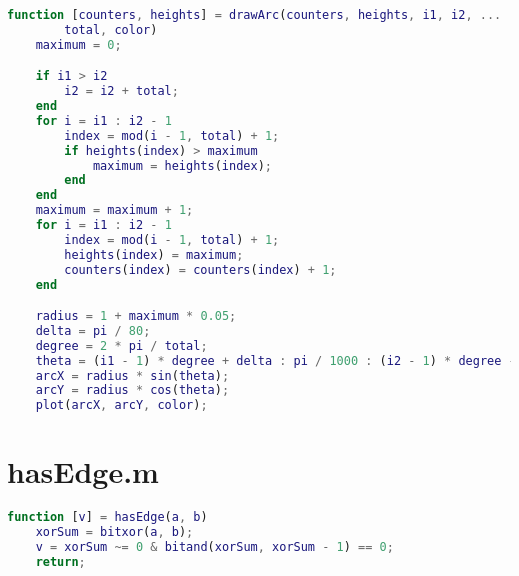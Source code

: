 \begin{lstlisting}[language = Matlab]
%% drawArc: draw an arc
function [counters, heights] = drawArc(counters, heights, i1, i2, ...
		total, color)
	maximum = 0;

	if i1 > i2
		i2 = i2 + total;
	end
	for i = i1 : i2 - 1
		index = mod(i - 1, total) + 1;
		if heights(index) > maximum
			maximum = heights(index);
		end
	end
	maximum = maximum + 1;
	for i = i1 : i2 - 1
		index = mod(i - 1, total) + 1;
		heights(index) = maximum;
		counters(index) = counters(index) + 1;
	end

	radius = 1 + maximum * 0.05;
	delta = pi / 80;
	degree = 2 * pi / total;
	theta = (i1 - 1) * degree + delta : pi / 1000 : (i2 - 1) * degree - delta;
	arcX = radius * sin(theta);
	arcY = radius * cos(theta);
	plot(arcX, arcY, color);
\end{lstlisting}

\clearpage
\section{hasEdge.m}
\label{Section B.3}

\begin{lstlisting}[language = Matlab]
%% hasEdge: determine if two vertices have an edge between them
function [v] = hasEdge(a, b)
	xorSum = bitxor(a, b);
	v = xorSum ~= 0 & bitand(xorSum, xorSum - 1) == 0;
	return;
\end{lstlisting}
